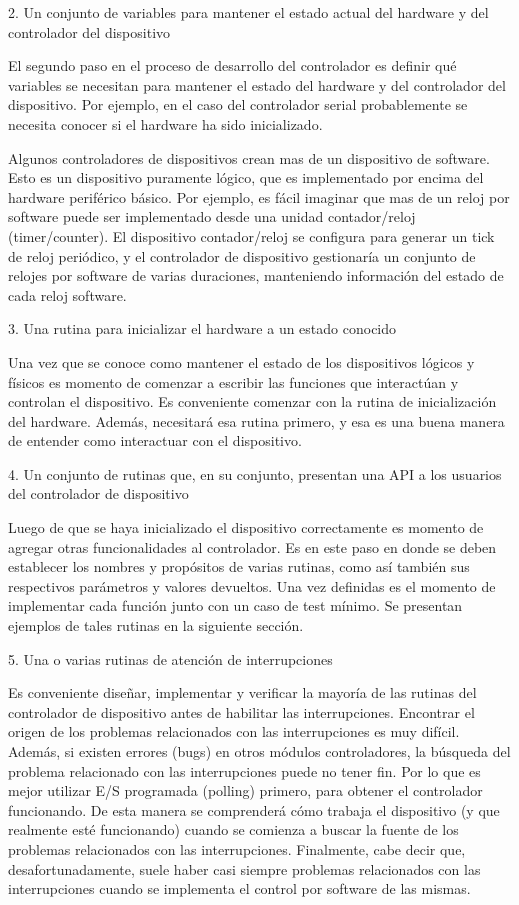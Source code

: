 \documentclass[12pt]{article}
\begin{document}
2. Un conjunto de variables para mantener el estado actual del hardware
y del controlador del dispositivo

El segundo paso en el proceso de desarrollo del controlador es definir
qué variables se necesitan para mantener el estado del hardware y 
del controlador del dispositivo. Por ejemplo, en el caso del controlador 
serial probablemente se necesita conocer si el
hardware ha sido inicializado.

Algunos controladores de dispositivos crean mas de un dispositivo de software.
Esto es un dispositivo puramente lógico, que es implementado por encima
del hardware periférico básico. Por ejemplo, es fácil imaginar
que mas de un reloj por software puede ser implementado desde una
unidad contador/reloj (timer/counter). El dispositivo contador/reloj se configura
para generar un tick de reloj periódico, y el controlador de dispositivo
gestionaría un conjunto de relojes por software de varias duraciones,
manteniendo información del estado de cada reloj software.

3. Una rutina para inicializar el hardware a un estado conocido

Una vez que se conoce como mantener el estado de los dispositivos 
lógicos y físicos es momento de comenzar a escribir las funciones que 
interactúan y controlan el dispositivo. Es conveniente comenzar 
con la rutina de inicialización del hardware. Además, necesitará
esa rutina primero, y esa es una buena manera de entender como interactuar
con el dispositivo.

4. Un conjunto de rutinas que, en su conjunto, presentan una API 
a los usuarios del controlador de dispositivo

Luego de que se haya inicializado el dispositivo correctamente es
momento de agregar otras funcionalidades al controlador. Es en este
paso en donde se deben establecer los nombres y propósitos de varias 
rutinas, como así también sus respectivos parámetros y valores devueltos.
Una vez definidas es el momento de implementar cada función junto
con un caso de test mínimo. Se presentan ejemplos de tales rutinas
en la siguiente sección.

5. Una o varias rutinas de atención de interrupciones

Es conveniente diseñar, implementar y verificar la mayoría de las rutinas
del controlador de dispositivo antes de habilitar las interrupciones.
Encontrar el origen de los problemas relacionados con las interrupciones
es muy difícil. Además, si existen errores (bugs) en otros módulos
controladores, la búsqueda del problema relacionado con las interrupciones
puede no tener fin. Por lo que es mejor utilizar 
E/S programada (polling) primero, para obtener el controlador funcionando.
De esta manera se comprenderá cómo trabaja el dispositivo (y que 
realmente esté funcionando) cuando se comienza a buscar la fuente
de los problemas relacionados con las interrupciones. Finalmente, cabe
decir que, desafortunadamente, suele haber casi siempre problemas 
relacionados con las interrupciones cuando se implementa el control por 
software de las mismas.
\end{document}
